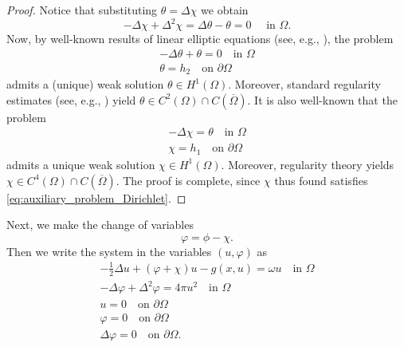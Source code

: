 \documentclass[10pt,a4paper]{amsart}
\numberwithin{equation}{section}
\begin{document}
\begin{proof}
Notice that substituting $\theta = \Delta \chi$ we obtain
 \[
 - \Delta \chi + \Delta^2 \chi = \Delta \theta - \theta = 0 \quad \text{ in } \Omega.
 \]
Now, by well-known results of linear elliptic equations (see, e.g., \cite{Brezis2010}), 
the problem
\begin{gather*}
 - \Delta \theta + \theta  =  0  \quad \text{in } \Omega \\
 \theta  =  h_2  \quad \text{on } \partial\Omega
 \end{gather*}
admits a (unique) weak solution $\theta \in H^1(\Omega)$. 
Moreover, standard regularity estimates (see, e.g., \cite{GilbargTrudinger2001}) 
yield $\theta \in C^2(\Omega) \cap C(\overline \Omega)$.
It is also well-known that the problem
 \begin{gather*}
 - \Delta \chi  =  \theta  \quad \text{in } \Omega \\
 \chi  =  h_1 \quad \text{on } \partial\Omega
 \end{gather*}
admits a unique weak solution $\chi \in H^1(\Omega)$. Moreover, regularity theory 
yields $\chi \in C^4(\Omega) \cap C(\overline \Omega)$.
The proof is complete, since $\chi$ thus found satisfies 
\eqref{eq:auxiliary_problem_Dirichlet}.
\end{proof}

Next, we make the change of variables
\[
 \varphi = \phi - \chi.
\]
Then we write the system in the variables $(u, \varphi)$ as
\begin{equation}
 \label{eq:modified_system_Dirichlet}
\begin{gathered}
 - \frac{1}{2} \Delta u + (\varphi + \chi)u - g(x, u) 
 =  \omega u  \quad \text{in } \Omega \\
 - \Delta \varphi + \Delta^2 \varphi  =  4 \pi u^2  \quad \text{in } \Omega \\
 u  = 0 \quad \text{on } \partial\Omega \\
 \varphi  =  0  \quad \text{on } \partial\Omega \\
 \Delta \varphi  =  0  \quad \text{on } \partial\Omega.
 \end{gathered}
\end{equation}
\end{document}
